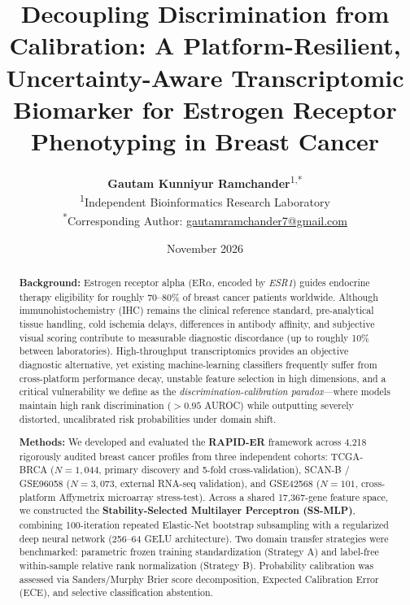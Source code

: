 \documentclass[11pt,a4paper]{article}
\title{\textbf{Decoupling Discrimination from Calibration: A Platform-Resilient, Uncertainty-Aware Transcriptomic Biomarker for Estrogen Receptor Phenotyping in Breast Cancer}}
\author{
  \textbf{Gautam Kunniyur Ramchander}\textsuperscript{1,*} \\
  \small\textsuperscript{1}Independent Bioinformatics Research Laboratory \\
  \small\textsuperscript{*}Corresponding Author: \href{mailto:gautamramchander7@gmail.com}{gautamramchander7@gmail.com}
}
\date{November 2026}
\begin{document}
\maketitle

\begin{abstract}
\noindent\textbf{Background:} Estrogen receptor alpha (ER$\alpha$, encoded by \textit{ESR1}) guides endocrine therapy eligibility for roughly 70--80\% of breast cancer patients worldwide. Although immunohistochemistry (IHC) remains the clinical reference standard, pre-analytical tissue handling, cold ischemia delays, differences in antibody affinity, and subjective visual scoring contribute to measurable diagnostic discordance (up to roughly 10\% between laboratories). High-throughput transcriptomics provides an objective diagnostic alternative, yet existing machine-learning classifiers frequently suffer from cross-platform performance decay, unstable feature selection in high dimensions, and a critical vulnerability we define as the \textit{discrimination-calibration paradox}---where models maintain high rank discrimination ($>0.95$ AUROC) while outputting severely distorted, uncalibrated risk probabilities under domain shift.

\medskip
\noindent\textbf{Methods:} We developed and evaluated the \textbf{RAPID-ER} framework across 4,218 rigorously audited breast cancer profiles from three independent cohorts: TCGA-BRCA ($N = 1{,}044$, primary discovery and 5-fold cross-validation), SCAN-B / GSE96058 ($N = 3{,}073$, external RNA-seq validation), and GSE42568 ($N = 101$, cross-platform Affymetrix microarray stress-test). Across a shared 17,367-gene feature space, we constructed the \textbf{Stability-Selected Multilayer Perceptron (SS-MLP)}, combining 100-iteration repeated Elastic-Net bootstrap subsampling with a regularized deep neural network (256--64 GELU architecture). Two domain transfer strategies were benchmarked: parametric frozen training standardization (Strategy A) and label-free within-sample relative rank normalization (Strategy B). Probability calibration was assessed via Sanders/Murphy Brier score decomposition, Expected Calibration Error (ECE), and selective classification abstention.


\end{abstract}
\end{document}
